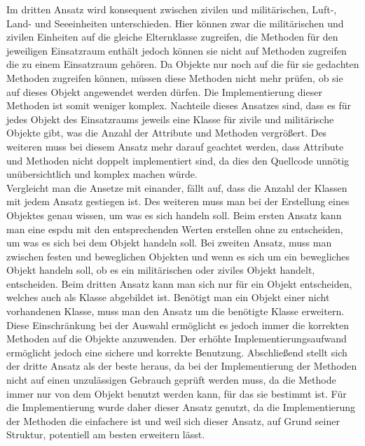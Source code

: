 Im dritten Ansatz wird konsequent zwischen zivilen und militärischen, Luft-, Land- und Seeeinheiten unterschieden. Hier können zwar die militärischen und zivilen Einheiten auf die gleiche Elternklasse zugreifen, die Methoden für den jeweiligen Einsatzraum enthält jedoch können sie nicht auf Methoden zugreifen die zu einem Einsatzraum gehören. Da Objekte nur noch auf die für sie gedachten Methoden zugreifen können, müssen diese Methoden nicht mehr prüfen, ob sie auf dieses Objekt angewendet werden dürfen. Die Implementierung dieser Methoden ist somit weniger komplex. Nachteile dieses Ansatzes sind, dass es für jedes Objekt des Einsatzraums jeweils eine Klasse für zivile und militärische Objekte gibt, was die Anzahl der Attribute und Methoden vergrößert. Des weiteren  muss bei diesem Ansatz mehr darauf geachtet werden, dass Attribute und Methoden  nicht doppelt implementiert sind, da dies den Quellcode unnötig unübersichtlich und komplex machen würde. 
\\
Vergleicht man die Ansetze mit einander, fällt auf, dass die Anzahl der Klassen mit jedem Ansatz gestiegen ist. Des weiteren muss man bei der Erstellung eines Objektes genau wissen, um was es sich handeln soll.
Beim ersten Ansatz kann man eine \ac{espdu} mit den entsprechenden Werten erstellen ohne zu entscheiden, um was es sich bei dem Objekt handeln soll. Bei zweiten Ansatz, muss man zwischen festen und beweglichen Objekten und wenn es sich um ein bewegliches Objekt handeln soll, ob es ein militärischen oder ziviles Objekt handelt, entscheiden. Beim dritten Ansatz kann man sich nur für ein Objekt entscheiden, welches auch als Klasse abgebildet ist. Benötigt man ein Objekt einer nicht vorhandenen Klasse, muss man den Ansatz um die benötigte Klasse erweitern. Diese Einschränkung bei der Auswahl ermöglicht es jedoch immer die korrekten Methoden auf die Objekte anzuwenden. Der erhöhte Implementierungsaufwand ermöglicht jedoch eine sichere und korrekte Benutzung. 
Abschließend stellt sich der dritte Ansatz als der beste heraus, da bei der Implementierung der Methoden nicht auf einen unzulässigen Gebrauch geprüft werden muss, da die Methode immer nur von dem Objekt benutzt werden kann, für das sie bestimmt ist. Für die Implementierung wurde daher dieser Ansatz genutzt, da die Implementierung der Methoden die einfachere ist und weil sich dieser Ansatz, auf Grund seiner Struktur,  potentiell am  besten erweitern lässt.  

